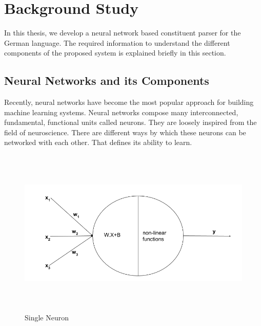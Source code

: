 \documentclass[a4paper, 11pt]{article}
\begin{document}




\pagebreak
\section{Background Study}
 In this thesis, we develop a neural network based constituent parser for the German language. The required information to understand the different components of the proposed system is explained briefly in this section. 

\subsection{Neural Networks and its Components}

Recently, neural networks have become the most popular approach for building machine learning systems. Neural networks compose many interconnected, fundamental, functional units called neurons. They are loosely inspired from the field of neuroscience. There are different ways by which these neurons can be networked with each other. That defines its ability to learn. 

\begin{figure}[H]
    \centering
    \includegraphics[width=\textwidth,height=8cm,keepaspectratio=true]
    {single-neuron.png}
    \caption{
        Single Neuron
    }
    \label{fig:single_neuron}
\end{figure}
\end{document}

